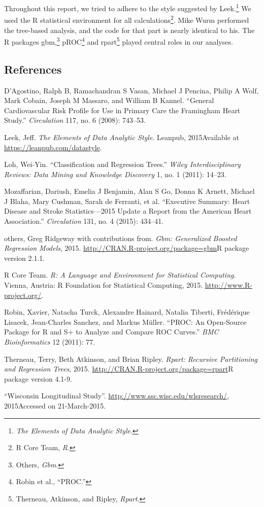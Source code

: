 \documentclass[11pt,]{article}
\let\rmarkdownfootnote\footnote%
\def\footnote{\protect\rmarkdownfootnote}
\begin{document}
Throughout this report, we tried to adhere to the style suggested by
Leek.\footnote{\emph{The Elements of Data Analytic Style}.} We used the
R statistical environment for all calculations\footnote{R Core Team,
  \emph{R}. }. Mike Wurm performed the tree-based analysis, and the code
for that part is nearly identical to his. The R packages gbm,\footnote{Others,
  \emph{Gbm}. } pROC\footnote{Robin et al., ``PROC.'' } and
rpart\footnote{Therneau, Atkinson, and Ripley, \emph{Rpart}. } played
central roles in our analyses.

\subsection*{References}\label{references}

D'Agostino, Ralph B, Ramachandran S Vasan, Michael J Pencina, Philip A
Wolf, Mark Cobain, Joseph M Massaro, and William B Kannel. ``General
Cardiovascular Risk Profile for Use in Primary Care the Framingham Heart
Study.'' \emph{Circulation} 117, no. 6 (2008): 743--53.

Leek, Jeff. \emph{The Elements of Data Analytic Style}. Leanpub,
2015Available at \url{https://leanpub.com/datastyle}.

Loh, Wei-Yin. ``Classification and Regression Trees.'' \emph{Wiley
Interdisciplinary Reviews: Data Mining and Knowledge Discovery} 1, no. 1
(2011): 14--23.

Mozaffarian, Dariush, Emelia J Benjamin, Alan S Go, Donna K Arnett,
Michael J Blaha, Mary Cushman, Sarah de Ferranti, et al. ``Executive
Summary: Heart Disease and Stroke Statistics---2015 Update a Report from
the American Heart Association.'' \emph{Circulation} 131, no. 4 (2015):
434--41.

others, Greg Ridgeway with contributions from. \emph{Gbm: Generalized
Boosted Regression Models}, 2015.
\url{http://CRAN.R-project.org/package=gbm}R package version 2.1.1.

R Core Team. \emph{R: A Language and Environment for Statistical
Computing}. Vienna, Austria: R Foundation for Statistical Computing,
2015. \url{http://www.R-project.org/}.

Robin, Xavier, Natacha Turck, Alexandre Hainard, Natalia Tiberti,
Frédérique Lisacek, Jean-Charles Sanchez, and Markus Müller. ``PROC: An
Open-Source Package for R and S+ to Analyze and Compare ROC Curves.''
\emph{BMC Bioinformatics} 12 (2011): 77.

Therneau, Terry, Beth Atkinson, and Brian Ripley. \emph{Rpart: Recursive
Partitioning and Regression Trees}, 2015.
\url{http://CRAN.R-project.org/package=rpart}R package version 4.1-9.

``Wisconsin Longitudinal Study''.
\url{http://www.ssc.wisc.edu/wlsresearch/}, 2015Accessed on
21-March-2015.
\end{document}
